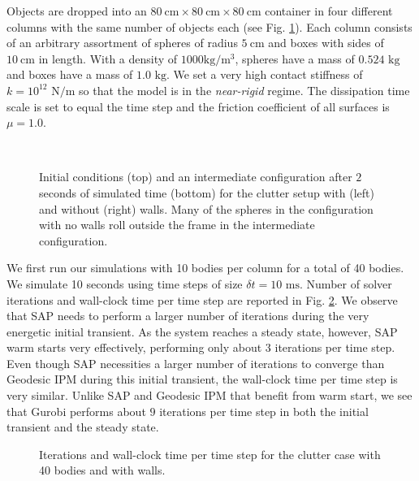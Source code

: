 
Objects are
dropped into an $80~\text{cm}\times80~\text{cm}\times80~\text{cm}$ container in four different columns with the same number of
objects each (see Fig. \ref{fig:clutter_snapshots}). Each column consists of an
arbitrary assortment of spheres of radius $5~\text{cm}$ and boxes with sides of
$10~\text{cm}$ in length. With a density of $1000\text{
kg}/\text{m}^3$, spheres have a mass of
$0.524\text{ kg}$ and boxes have a mass of $1.0\text{ kg}$. We set a very high
contact stiffness of $k=10^{12}\text{ N}/\text{m}$ so that the model is in the
\emph{near-rigid} regime. The dissipation time scale is set to equal the time
step and the friction coefficient of all surfaces is $\mu=1.0$.
\begin{figure}[t]
    \centering
    \\
    \vspace{0.1cm}
    \caption{Initial conditions (top) and an intermediate configuration after $2$ seconds of
    simulated time (bottom) for the clutter setup with (left) and without
    (right) walls. Many of the spheres in the configuration with no walls
	roll outside the frame in the intermediate configuration.}
    \label{fig:clutter_snapshots}
\end{figure}

We first run our simulations with 10 bodies per column for a total of 40 bodies.
We simulate 10 seconds using time steps of size $\delta t = 10\text{ ms}$.
Number of solver iterations and wall-clock time per time step are reported in
Fig. \ref{fig:clutter_w_walls_nb40}. We observe that SAP
needs to perform a larger number of iterations during the very energetic initial
transient. As the system reaches a steady state, however, SAP warm starts very
effectively, performing only about $3$ iterations per time step. Even though
SAP necessities a larger number of iterations to converge than Geodesic IPM during this initial transient, the wall-clock time per time step is very
similar. Unlike SAP and Geodesic IPM that benefit from warm start, we see that Gurobi performs
about $9$ iterations per time step in both the initial transient and the steady state.
\begin{figure}[!h]
	\centering
	\caption{\label{fig:clutter_w_walls_nb40} 
	Iterations and wall-clock time per time step for the clutter case with 40 bodies and with walls.}
\end{figure}

